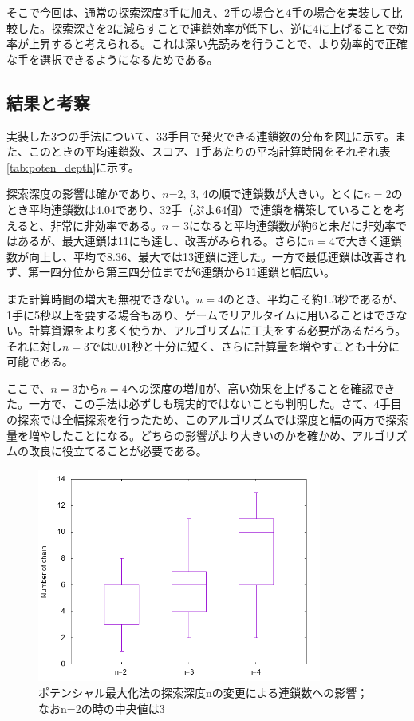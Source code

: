 \documentclass[12pt]{jreport}
\begin{document}
そこで今回は、通常の探索深度3手に加え、2手の場合と4手の場合を実装して比較した。探索深さを2に減らすことで連鎖効率が低下し、逆に4に上げることで効率が上昇すると考えられる。これは深い先読みを行うことで、より効率的で正確な手を選択できるようになるためである。

\subsection{結果と考察}
実装した3つの手法について、33手目で発火できる連鎖数の分布を図\ref{fig:poten_chain_depth}に示す。また、このときの平均連鎖数、スコア、1手あたりの平均計算時間をそれぞれ表\ref{tab:poten_depth}に示す。

探索深度の影響は確かであり、$n$=2, 3, 4の順で連鎖数が大きい。とくに$n=2$のとき平均連鎖数は4.04であり、32手（ぷよ64個）で連鎖を構築していることを考えると、非常に非効率である。$n=3$になると平均連鎖数が約6と未だに非効率ではあるが、最大連鎖は11にも達し、改善がみられる。さらに$n=4$で大きく連鎖数が向上し、平均で8.36、最大では13連鎖に達した。一方で最低連鎖は改善されず、第一四分位から第三四分位までが6連鎖から11連鎖と幅広い。

また計算時間の増大も無視できない。$n=4$のとき、平均こそ約1.3秒であるが、1手に5秒以上を要する場合もあり、ゲームでリアルタイムに用いることはできない。計算資源をより多く使うか、アルゴリズムに工夫をする必要があるだろう。それに対し$n=3$では0.01秒と十分に短く、さらに計算量を増やすことも十分に可能である。

ここで、$n=3$から$n=4$への深度の増加が、高い効果を上げることを確認できた。一方で、この手法は必ずしも現実的ではないことも判明した。さて、4手目の探索では全幅探索を行ったため、このアルゴリズムでは深度と幅の両方で探索量を増やしたことになる。どちらの影響がより大きいのかを確かめ、アルゴリズムの改良に役立てることが必要である。

\begin{figure}[tb]
  \begin{center}
  \includegraphics[height=7cm]{experiment/Potential/KAI/graph/chain_N2_4.png}
  \caption{ポテンシャル最大化法の探索深度nの変更による連鎖数への影響；なおn=2の時の中央値は3} \label{fig:poten_chain_depth}
\end{center}
\end{figure}
\end{document}
